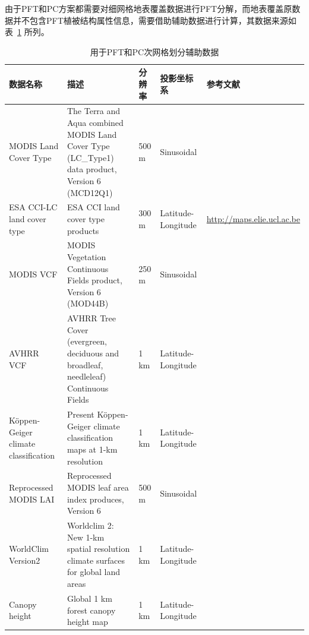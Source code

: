 由于PFT和PC方案都需要对细网格地表覆盖数据进行PFT分解，而地表覆盖原数据并不包含PFT植被结构属性信息，需要借助辅助数据进行计算，其数据来源如表~\ref{tab:网格划分辅助数据} 所列。

\begin{landscape}
\begin{table}[htbp]
\centering
\caption{用于PFT和PC次网格划分辅助数据}
\label{tab:网格划分辅助数据}

\begin{tabular}[h]{p{3cm}p{6cm}p{2cm}p{2cm}p{5cm}}
\toprule
数据名称      & 描述        & 分辨率   & 投影坐标系     & 参考文献           \\ \midrule
MODIS Land Cover Type & The Terra and Aqua combined MODIS Land Cover Type (LC\_Type1) data product, Version 6 (MCD12Q1) & 500 m & Sinusoidal        & \citet{Friedl2019}                \\\midrule
ESA CCI-LC land cover type         & ESA CCI land cover type products                                                                & 300 m & Latitude-Longitude & \url{http://maps.elie.ucl.ac.be} \\\midrule
MODIS VCF      & MODIS Vegetation Continuous Fields product, Version 6 (MOD44B)                                           & 250 m    & Sinusoidal         & \citet{DiMiceli2015}                        \\\midrule
AVHRR VCF& AVHRR Tree Cover (evergreen, deciduous and broadleaf, needleleaf) Continuous Fields                      & 1 km  & Latitude-Longitude & \citet{defries2000new}                         \\\midrule
Köppen-Geiger climate classification        & Present Köppen-Geiger climate classification maps at 1-km resolution                            & 1 km  & Latitude-Longitude & \citet{beck2018}     \\\midrule
Reprocessed MODIS LAI                 & Reprocessed MODIS leaf area index produces, Version 6                                           & 500 m & Sinusoidal         & \citet{yuan2011reprocessing,lin2023ReprocessedMODISVersion}     \\\midrule
WorldClim Version2                    & Worldclim 2: New 1-km spatial resolution climate surfaces for global land areas                          & 1 km  & Latitude-Longitude & \citet{fick2017worldclim}   \\\midrule
Canopy height                         & Global 1 km forest canopy height map                                                            & 1 km  & Latitude-Longitude & \citet{simard2011mapping}             \\ \bottomrule
\end{tabular}
\end{table}
\end{landscape}

